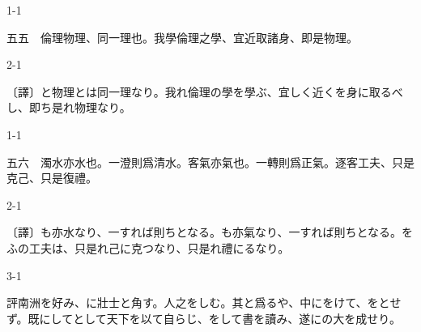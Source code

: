 \documentclass[tate,paper=b6j,jafontsize=9pt]{jlreq}
\begin{document}
\begin{azconvIndented}{1\zw}{-1\zw}

五五　倫理物理、同一理也。我學倫理之學、宜近取諸身、即是物理。

\end{azconvIndented}
\begin{azconvIndented}{2\zw}{-1\zw}

〔譯〕と物理とは同一理なり。我れ倫理の學を學ぶ、宜しく近くを身に取るべし、即ち是れ物理なり。

\end{azconvIndented}

\begin{azconvIndented}{1\zw}{-1\zw}

五六　濁水亦水也。一澄則爲清水。客氣亦氣也。一轉則爲正氣。逐客工夫、只是克己、只是復禮。

\end{azconvIndented}
\begin{azconvIndented}{2\zw}{-1\zw}

〔譯〕も亦水なり、一すれば則ちとなる。も亦氣なり、一すれば則ちとなる。をふの工夫は、只是れ己に克つなり、只是れ禮にるなり。

\end{azconvIndented}
\begin{azconvIndented}{3\zw}{-1\zw}

評南洲を好み、に壯士と角す。人之をしむ。其と爲るや、中にをけて、をとせず。既にしてとして天下を以て自らじ、をして書を讀み、遂にの大を成せり。

\end{azconvIndented}
\end{document}
